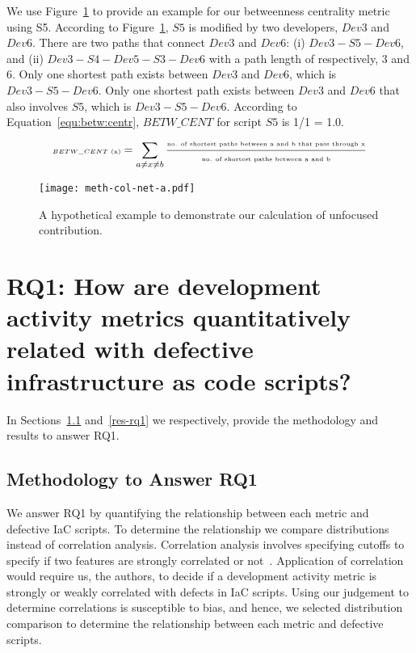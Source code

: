 \documentclass[smallextended]{svjour3}       %
\begin{document}
We use Figure~\ref{fig-meth-col-net} to provide an example for our betweenness centrality metric using S5. According to Figure~\ref{fig-meth-col-net}, $S5$ is modified by two developers, $Dev3$ and $Dev6$. There are two paths that connect $Dev3$ and $Dev6$: (i) $Dev3-S5-Dev6$, and (ii) $Dev3-S4-Dev5-S3-Dev6$ with a path length of respectively, 3 and 6. Only one shortest path exists between $Dev3$ and $Dev6$, which  is $Dev3-S5-Dev6$. Only one shortest path exists between $Dev3$ and $Dev6$ that also involves $S5$, which is $Dev3-S5-Dev6$. According to Equation~\ref{equ:betw:centr}, $BETW\_CENT$ for script $S5$ is 1/1 = 1.0.     

\begin{equation}
\text{\tiny{$BETW\_CENT$ (x)}}= \sum\limits_{a \neq x \neq b } \frac{\text{\tiny{no. of shortest paths between a and b that pass through x}}}{\text{\tiny{no. of shortest paths between a and b}}}
\label{equ:betw:centr}
\end{equation}


\begin{figure}[]
\centering
\texttt{[image: meth-col-net-a.pdf]}
\caption{A hypothetical example to demonstrate our calculation of unfocused contribution.}
\label{fig-meth-col-net}
\end{figure}


\section{RQ1: How are development activity metrics quantitatively related with defective infrastructure as code scripts?}
\label{rq1}

In Sections~\ref{meth-rq1} and~\ref{res-rq1} we respectively, provide the methodology and results to answer RQ1. 

\subsection{Methodology to Answer RQ1}
\label{meth-rq1}

We answer RQ1 by quantifying the relationship between each metric and defective IaC scripts. To determine the relationship we compare distributions instead of correlation analysis. Correlation analysis involves specifying cutoffs to specify if two features are strongly correlated or not~\cite{Tan:2005:IDM}. Application of correlation would require us, the authors, to decide if a development activity metric is strongly or weakly correlated with defects in IaC scripts. Using our judgement to determine correlations is susceptible to bias, and hence, we selected distribution comparison to determine the relationship between each metric and defective scripts. 
\end{document}
